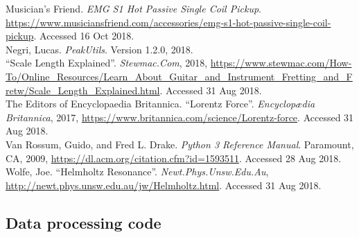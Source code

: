 \documentclass{article}
\begin{document}
\begin{hangparas}{.25in}{1}
Musician's Friend. \textit{EMG S1 Hot Passive Single Coil Pickup}.
\url{https://www.musiciansfriend.com/accessories/emg-s1-hot-passive-single-coil-pickup}.
Accessed 16 Oct 2018. \\

Negri, Lucas. \textit{PeakUtils}. Version 1.2.0, 2018.\\

``Scale Length Explained''. \textit{Stewmac.Com}, 2018,
\url{https://www.stewmac.com/How-To/Online_Resources/Learn_About_Guitar_and_Instrument_Fretting_and_Fretw/Scale_Length_Explained.html}. Accessed 31 Aug 2018.\\

The Editors of Encyclopaedia Britannica. ``Lorentz Force''.
\textit{Encyclopædia Britannica}, 2017,
\url{https://www.britannica.com/science/Lorentz-force}. Accessed 31 Aug 2018.\\

Van Rossum, Guido, and Fred L. Drake. \textit{Python 3 Reference Manual}.
Paramount, CA, 2009, \url{https://dl.acm.org/citation.cfm?id=1593511}.
Accessed 28 Aug 2018.\\

Wolfe, Joe. ``Helmholtz Resonance''. \textit{Newt.Phys.Unsw.Edu.Au},
\url{http://newt.phys.unsw.edu.au/jw/Helmholtz.html}. Accessed 31 Aug 2018.\\

\end{hangparas}

\pagebreak
\begin{appendices}

	\section*{Data processing code}
	
	
	
	
	
	

\end{appendices}
\end{document}
